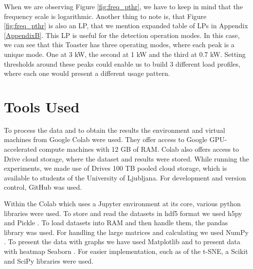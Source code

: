 When we are observing Figure \ref{fig:freq_pthr}, we have to keep in mind that the frequency scale is logarithmic.
Another thing to note is, that Figure \ref{fig:freq_pthr} is also an LP, that we mention expanded table of LPs in Appendix \ref{AppendixB}.
This LP is useful for the detection operation modes.
In this case, we can see that this Toaster has three operating modes, where each peak is a unique mode.
One at 3 kW, the second at 1 kW and the third at 0.7 kW.
Setting thresholds around these peaks could enable us to build 3 different load profiles, where each one would present a different usage pattern.

\section{Tools Used}

To process the data and to obtain the results the environment and virtual machines from Google Colab \cite{colab} were used.
They offer access to Google GPU-accelerated compute machines with 12 GB of RAM. 
Colab also offers access to Drive cloud storage, where the dataset and results were stored.
While running the experiments, we made use of Drives 100 TB pooled cloud storage, which is available to students of the University of Ljubljana. 
For development and version control, GitHub was used. 

Within the Colab which uses a Jupyter \cite{jupyter} environment at its core, various python libraries were used.
To store and read the datasets in hdf5 format we used h5py  \cite{hdf5} and Pickle  \cite{pickle}.
To load datasets into RAM and then handle them, the pandas  \cite{pandas} library was used.
For handling the large matrices and calculating we used NumPy  \cite{numpy}.
To present the data with graphs we have used Matplotlib  \cite{matplotlib} and to present data with heatmap Seaborn  \cite{seaborn}.
For easier implementation, such as of the t-SNE, a Scikit  \cite{scikit} and SciPy  \cite{scipy} libraries were used.
